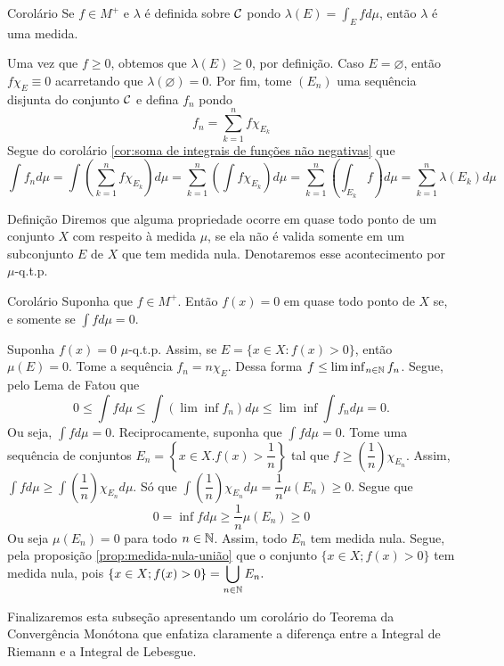 \begin{env}{Corolário}
	Se $f \in M^+$ e $\lambda$ é definida sobre $\operatorname{\mathcal{C}}$ pondo
	$
	\lambda(E) = \int_E fd\mu 
	$,
	então $\lambda$ é uma medida.
\end{env}

\begin{prova}
	Uma vez que $f \geq 0$, obtemos que $\lambda(E) \geq 0$, por definição.
	Caso $E = \varnothing$, então $f\chi_E \equiv 0$ acarretando que $\lambda(\varnothing) = 0$.
	Por fim, tome $(E_n)$ uma sequência disjunta do conjunto $\operatorname{\mathcal{C}}$ e defina
	$f_n$ pondo
	$$
	f_n = \sum_{k =1}^nf\chi_{E_k}
	$$
	Segue do corolário \ref{cor:soma de integrais de funções não negativas} que
	$$
	\int f_n d\mu
	= \int \left(\sum_{k =1}^nf\chi_{E_k}\right) d\mu
	= \sum_{k =1}^n \left(\int f\chi_{E_k}\right) d\mu
	= \sum_{k =1}^n \left(\int_{E_k} f\right) d\mu
	= \sum_{k =1}^n \lambda(E_k) d\mu
	$$
\end{prova}


\begin{env}{Definição}
	\label{def:quase-todo-ponto}
	Diremos que alguma propriedade ocorre em quase todo ponto de um conjunto $X$ com respeito à medida $\mu$, se ela não é valida somente em um subconjunto $E$ de $X$ que tem medida nula.
	Denotaremos esse acontecimento por $\mu$-q.t.p.
\end{env}

\begin{env}{Corolário}
	Suponha que $f \in M^+$. Então
	$f(x) = 0$ em quase todo ponto de $X$ se, e somente se $\displaystyle \int fd\mu = 0$.
\end{env}

\begin{prova}
	Suponha $f(x) = 0$ $\mu$-q.t.p.
	Assim, se $E = \{ x \in X: f(x) > 0\}$, então $\mu(E) = 0$.
	Tome a sequência $f_n = n\chi_E$.
	Dessa forma $f \leq \lim \inf_{n \in \operatorname{\mathbb{N}}} f_n$.
	Segue, pelo Lema de Fatou que
	$$
	0 
	\leq
	\int f d\mu
	\leq
	\int (\lim \inf f_n) d\mu
	\leq
	\lim \inf \int f_n d\mu
	=
	0.
	$$
	Ou seja, $\displaystyle\int f d\mu = 0$.
	Reciprocamente, suponha que $\displaystyle\int f d\mu = 0$.
	Tome uma sequência de conjuntos 
	$E_n = \left\{ x \in X. f(x) > \dfrac{1}{n}\right\}$ tal que 
	$f \geq \left(\dfrac{1}{n}\right)\chi_{E_n}$.
	Assim, $\int f d\mu \geq \int \left(\dfrac{1}{n}\right)\chi_{E_n} d\mu$.
	Só que 
	$\int \left(\dfrac{1}{n}\right)\chi_{E_n} d\mu
	= \dfrac{1}{n}\mu(E_n) \geq 0.
	$
	Segue que
	$$
	0 = \inf f d\mu 
	\geq 
	\dfrac{1}{n}\mu(E_n) \geq 0
	$$
	Ou seja $\mu(E_n) = 0$ para todo $n \in \operatorname{\mathbb{N}}$.
	Assim, todo $E_n$ tem medida nula.
	Segue, pela proposição \ref{prop:medida-nula-união}
	que o conjunto $\{x \in X; f(x) > 0\}$ tem medida nula, pois
	$\{x \in X; f(x) > 0\}
	=
	\displaystyle
	\bigcup_{n \in \operatorname{\mathbb{N}}} E_n.
	$
	
\end{prova}
Finalizaremos esta subseção apresentando um corolário do Teorema da Convergência Monótona que enfatiza claramente a diferença entre a Integral de Riemann e a Integral de Lebesgue.

